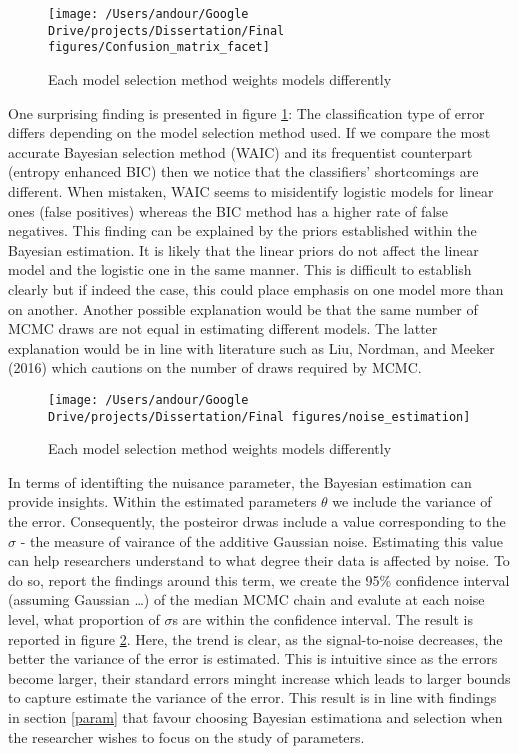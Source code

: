 \documentclass[12pt,]{article}
\begin{document}
\begin{figure}

{\centering \texttt{[image: /Users/andour/Google Drive/projects/Dissertation/Final figures/Confusion\_matrix\_facet]} 

}

\caption{Each model selection method weights models differently}\label{fig:cm}
\end{figure}

One surprising finding is presented in figure \ref{fig:cm}: The classification type of error differs depending on the model selection method used. If we compare the most accurate Bayesian selection method (WAIC) and its frequentist counterpart (entropy enhanced BIC) then we notice that the classifiers' shortcomings are different. When mistaken, WAIC seems to misidentify logistic models for linear ones (false positives) whereas the BIC method has a higher rate of false negatives. This finding can be explained by the priors established within the Bayesian estimation. It is likely that the linear priors do not affect the linear model and the logistic one in the same manner. This is difficult to establish clearly but if indeed the case, this could place emphasis on one model more than on another. Another possible explanation would be that the same number of MCMC draws are not equal in estimating different models. The latter explanation would be in line with literature such as Liu, Nordman, and Meeker (2016) which cautions on the number of draws required by MCMC.

\begin{figure}

{\centering \texttt{[image: /Users/andour/Google Drive/projects/Dissertation/Final figures/noise\_estimation]} 

}

\caption{Each model selection method weights models differently}\label{fig:noise}
\end{figure}

In terms of identifting the nuisance parameter, the Bayesian estimation can provide insights. Within the estimated parameters \(\theta\) we include the variance of the error. Consequently, the posteiror drwas include a value corresponding to the \(\sigma\) - the measure of vairance of the additive Gaussian noise. Estimating this value can help researchers understand to what degree their data is affected by noise. To do so, report the findings around this term, we create the 95\% confidence interval (assuming Gaussian \ldots{}) of the median MCMC chain and evalute at each noise level, what proportion of \(\sigma\)s are within the confidence interval. The result is reported in figure \ref{fig:noise}. Here, the trend is clear, as the signal-to-noise decreases, the better the variance of the error is estimated. This is intuitive since as the errors become larger, their standard errors minght increase which leads to larger bounds to capture estimate the variance of the error. This result is in line with findings in section \ref{param} that favour choosing Bayesian estimationa and selection when the researcher wishes to focus on the study of parameters.
\end{document}
